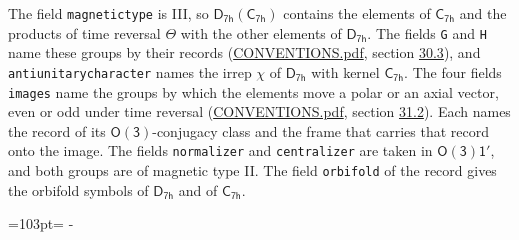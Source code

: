 \documentclass[10pt,a4paper]{article}
\newcommand{\needspace}[1]{\par\penalty-100\begingroup\dimen0=#1\relax\dimen2=\pagegoal
  \advance\dimen2-\pagetotal\ifdim\dimen0>\dimen2\relax\ifdim\dimen2>0pt\vfil\break\fi\fi
  \endgroup}
\numberwithin{equation}{section}
\newcommand{\grp}[1]{\mathsf{#1}}
\begin{document}
The field \texttt{magnetictype} is III, so $\grp{D_{7h}}(\grp{C_{7h}})$ contains the elements of $\grp{C_{7h}}$ and the products of time reversal $\varTheta$ with the other elements of $\grp{D_{7h}}$. The fields \texttt{G} and \texttt{H} name these groups by their records (\href{../../CONVENTIONS.pdf}{CONVENTIONS.pdf}, section \href{../../CONVENTIONS.pdf\#conv.30.3}{30.3}), and \texttt{antiunitarycharacter} names the irrep $\chi$ of $\grp{D_{7h}}$ with kernel $\grp{C_{7h}}$. The four fields \texttt{images} name the groups by which the elements move a polar or an axial vector, even or odd under time reversal (\href{../../CONVENTIONS.pdf}{CONVENTIONS.pdf}, section \href{../../CONVENTIONS.pdf\#conv.31.2}{31.2}). Each names the record of its $\grp{O(3)}$-conjugacy class and the frame that carries that record onto the image. The fields \texttt{normalizer} and \texttt{centralizer} are taken in $\grp{O(3)1'}$, and both groups are of magnetic type II. The field \texttt{orbifold} of the record gives the orbifold symbols of $\grp{D_{7h}}$ and of $\grp{C_{7h}}$.
\needspace{103pt}
\end{document}
